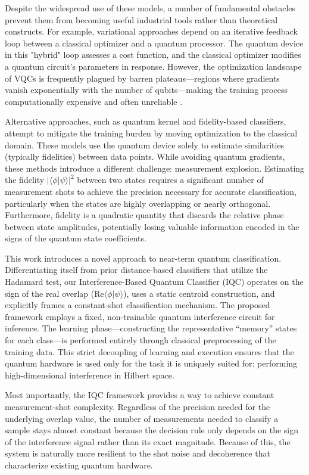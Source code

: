 \documentclass[conference]{IEEEtran}
\begin{document}
Despite the widespread use of these models, a number of fundamental obstacles prevent them from becoming useful industrial tools rather than theoretical constructs. For example, variational approaches depend on an iterative feedback loop between a classical optimizer and a quantum processor. The quantum device in this "hybrid" loop assesses a cost function, and the classical optimizer modifies a quantum circuit's parameters in response. However, the optimization landscape of VQCs is frequently plagued by barren plateaus—regions where gradients vanish exponentially with the number of qubits—making the training process computationally expensive and often unreliable \cite{mcclean2018barren}.

Alternative approaches, such as quantum kernel and fidelity-based classifiers, attempt to mitigate the training burden by moving optimization to the classical domain. These models use the quantum device solely to estimate similarities (typically fidelities) between data points. While avoiding quantum gradients, these methods introduce a different challenge: measurement explosion. Estimating the fidelity $|\langle \phi | \psi \rangle|^2$ between two states requires a significant number of measurement shots to achieve the precision necessary for accurate classification, particularly when the states are highly overlapping or nearly orthogonal. Furthermore, fidelity is a quadratic quantity that discards the relative phase between state amplitudes, potentially losing valuable information encoded in the signs of the quantum state coefficients.

This work introduces a novel approach to near-term quantum classification. Differentiating itself from prior distance-based classifiers that utilize the Hadamard test, our Interference-Based Quantum Classifier (IQC) operates on the sign of the real overlap ($\mathrm{Re}\langle \phi | \psi \rangle$), uses a static centroid construction, and explicitly frames a constant-shot classification mechanism. The proposed framework employs a fixed, non-trainable quantum interference circuit for inference. The learning phase---constructing the representative ``memory'' states for each class---is performed entirely through classical preprocessing of the training data. This strict decoupling of learning and execution ensures that the quantum hardware is used only for the task it is uniquely suited for: performing high-dimensional interference in Hilbert space.

Most importantly, the IQC framework provides a way to achieve constant measurement-shot complexity. Regardless of the precision needed for the underlying overlap value, the number of measurements needed to classify a sample stays almost constant because the decision rule only depends on the sign of the interference signal rather than its exact magnitude. Because of this, the system is naturally more resilient to the shot noise and decoherence that characterize existing quantum hardware.
\end{document}
